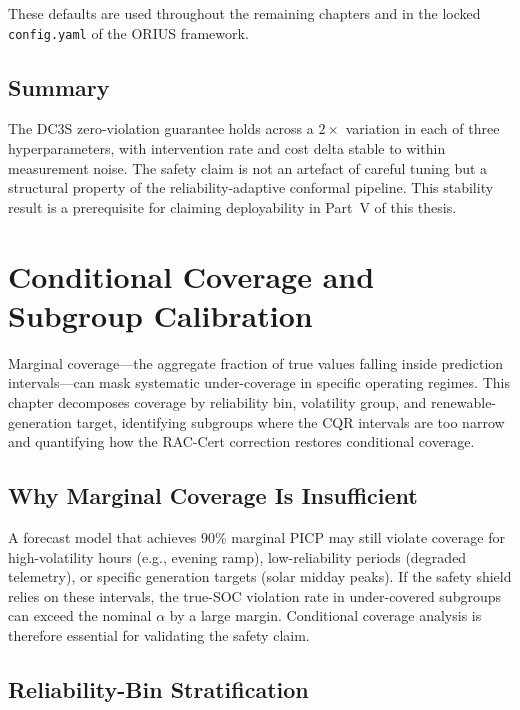 These defaults are used throughout the remaining chapters and in the
locked \texttt{config.yaml} of the ORIUS framework.

\subsection{Summary}

The DC3S zero-violation guarantee holds across a $2\times$ variation
in each of three hyperparameters, with intervention rate and cost delta
stable to within measurement noise.  The safety claim is not an artefact
of careful tuning but a structural property of the reliability-adaptive
conformal pipeline.  This stability result is a prerequisite for
claiming deployability in Part~V of this thesis.



\section{Conditional Coverage and Subgroup Calibration}
\label{ch:conditional-coverage}

Marginal coverage---the aggregate fraction of true values falling
inside prediction intervals---can mask systematic under-coverage in
specific operating regimes.  This chapter decomposes coverage by
reliability bin, volatility group, and renewable-generation target,
identifying subgroups where the CQR intervals are too narrow and
quantifying how the RAC-Cert correction restores conditional coverage.

\subsection{Why Marginal Coverage Is Insufficient}

A forecast model that achieves 90\% marginal PICP may still violate
coverage for high-volatility hours (e.g., evening ramp), low-reliability
periods (degraded telemetry), or specific generation targets (solar
midday peaks).  If the safety shield relies on these intervals, the
true-SOC violation rate in under-covered subgroups can exceed the
nominal $\alpha$ by a large margin.  Conditional coverage analysis
is therefore essential for validating the safety claim.

\subsection{Reliability-Bin Stratification}

